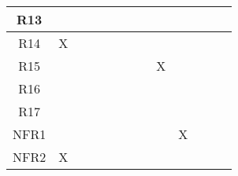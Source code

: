\documentclass[12pt, titlepage]{article}
\begin{document}
\begin{table}[H]
\begin{tabular}{|c|cccccccccccc|}
R13 & \multicolumn{1}{c|}{}  & \multicolumn{1}{c|}{}  & \multicolumn{1}{c|}{}
& \multicolumn{1}{c|}{}  & \multicolumn{1}{c|}{}  & \multicolumn{1}{c|}{}
& \multicolumn{1}{c|}{}  & \multicolumn{1}{c|}{}  & \multicolumn{1}{c|}{}
& \multicolumn{1}{c|}{}   & \multicolumn{1}{c|}{}   &    \\ \hline

R14 & \multicolumn{1}{c|}{X}  & \multicolumn{1}{c|}{}  & \multicolumn{1}{c|}{}
& \multicolumn{1}{c|}{}  & \multicolumn{1}{c|}{}  & \multicolumn{1}{c|}{}
& \multicolumn{1}{c|}{}  & \multicolumn{1}{c|}{}  & \multicolumn{1}{c|}{}
& \multicolumn{1}{c|}{}   & \multicolumn{1}{c|}{}   &    \\ \hline

R15 & \multicolumn{1}{c|}{}  & \multicolumn{1}{c|}{}  & \multicolumn{1}{c|}{}
& \multicolumn{1}{c|}{}  & \multicolumn{1}{c|}{}  & \multicolumn{1}{c|}{}
& \multicolumn{1}{c|}{}  & \multicolumn{1}{c|}{X}  & \multicolumn{1}{c|}{}
& \multicolumn{1}{c|}{}   & \multicolumn{1}{c|}{}   &    \\ \hline

R16 & \multicolumn{1}{c|}{}  & \multicolumn{1}{c|}{}  & \multicolumn{1}{c|}{}
& \multicolumn{1}{c|}{}  & \multicolumn{1}{c|}{}  & \multicolumn{1}{c|}{}
& \multicolumn{1}{c|}{}  & \multicolumn{1}{c|}{}  & \multicolumn{1}{c|}{}
& \multicolumn{1}{c|}{}   & \multicolumn{1}{c|}{}   &    \\ \hline

R17 & \multicolumn{1}{c|}{}  & \multicolumn{1}{c|}{}  & \multicolumn{1}{c|}{}
& \multicolumn{1}{c|}{}  & \multicolumn{1}{c|}{}  & \multicolumn{1}{c|}{}
& \multicolumn{1}{c|}{}  & \multicolumn{1}{c|}{}  & \multicolumn{1}{c|}{}
& \multicolumn{1}{c|}{}   & \multicolumn{1}{c|}{}   &    \\ \hline

NFR1 & \multicolumn{1}{c|}{}  & \multicolumn{1}{c|}{}  & \multicolumn{1}{c|}{}
& \multicolumn{1}{c|}{}  & \multicolumn{1}{c|}{}  & \multicolumn{1}{c|}{}
& \multicolumn{1}{c|}{}  & \multicolumn{1}{c|}{}  & \multicolumn{1}{c|}{X}
& \multicolumn{1}{c|}{}   & \multicolumn{1}{c|}{}   &    \\ \hline

NFR2 & \multicolumn{1}{c|}{X}  & \multicolumn{1}{c|}{}  & \multicolumn{1}{c|}{}
& \multicolumn{1}{c|}{}  & \multicolumn{1}{c|}{}  & \multicolumn{1}{c|}{}
& \multicolumn{1}{c|}{}  & \multicolumn{1}{c|}{}  & \multicolumn{1}{c|}{}
& \multicolumn{1}{c|}{}   & \multicolumn{1}{c|}{}   &    \\ \hline


\end{tabular}
\end{table}
\end{document}
